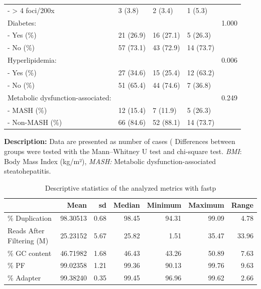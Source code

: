 \documentclass[
  11pt,
  letterpaper,
]{book}
\begin{document}
\begin{longtable}{lllll}
- > 4 foci/200x & 3 (3.8) & 2 (3.4) & 1 (5.3) & \\
Diabetes: &  &  &  & 1.000\\
- Yes (\%) & 21 (26.9) & 16 (27.1) & 5 (26.3) & \\
\addlinespace
- No (\%) & 57 (73.1) & 43 (72.9) & 14 (73.7) & \\
Hyperlipidemia: &  &  &  & 0.006\\
- Yes (\%) & 27 (34.6) & 15 (25.4) & 12 (63.2) & \\
- No (\%) & 51 (65.4) & 44 (74.6) & 7 (36.8) & \\
Metabolic dysfunction-associated: &  &  &  & 0.249\\
\addlinespace
- MASH (\%) & 12 (15.4) & 7 (11.9) & 5 (26.3) & \\
- Non-MASH (\%) & 66 (84.6) & 52 (88.1) & 14 (73.7) & \\
\bottomrule

\end{longtable}

\endgroup{}

\vspace{-1em}
\begin{flushleft}
\footnotesize{
\textbf{Description:} Data are presented as number of cases (%
Differences between groups were tested with the Mann–Whitney U test and chi-square test. 
\textit{BMI}: Body Mass Index (kg/m²), 
\textit{MASH:} Metabolic dysfunction-associated steatohepatitis.
}
\end{flushleft}

\clearpage

\begingroup\fontsize{11}{13}\selectfont

\begin{longtable}[t]{lrrrrrr}

\caption{\label{tbl-metrics}Descriptive statistics of the analyzed
metrics with fastp}

\tabularnewline

\toprule
\textbf{} & \textbf{Mean} & \textbf{sd} & \textbf{Median} & \textbf{Minimum} & \textbf{Maximum} & \textbf{Range}\\
\midrule
\% Duplication & 98.30513 & 0.68 & 98.45 & 94.31 & 99.09 & 4.78\\
Reads After Filtering (M) & 25.23152 & 5.67 & 25.82 & 1.51 & 35.47 & 33.96\\
\% GC content & 46.71982 & 1.68 & 46.43 & 43.26 & 50.89 & 7.63\\
\% PF & 99.02358 & 1.21 & 99.36 & 90.13 & 99.76 & 9.63\\
\% Adapter & 99.38240 & 0.35 & 99.45 & 96.96 & 99.62 & 2.66\\
\bottomrule

\end{longtable}
\end{document}
